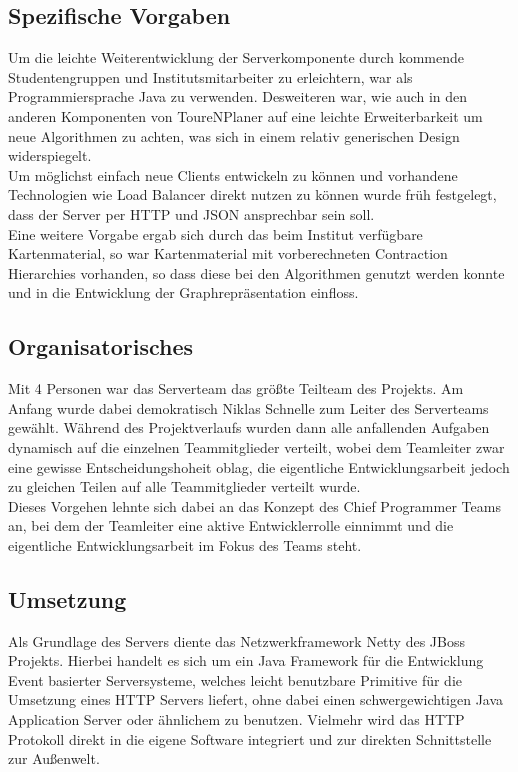 \subsection*{Spezifische Vorgaben}
Um die leichte Weiterentwicklung der Serverkomponente durch kommende Studentengruppen und Institutsmitarbeiter zu erleichtern, war als Programmiersprache Java zu verwenden. Desweiteren war, wie auch in den anderen Komponenten von ToureNPlaner auf eine leichte Erweiterbarkeit um neue Algorithmen zu achten, was sich in einem relativ generischen Design widerspiegelt.\\
Um möglichst einfach neue Clients entwickeln zu können und vorhandene Technologien wie Load Balancer direkt nutzen zu können wurde früh festgelegt, dass der Server per HTTP und JSON ansprechbar sein soll.\\
Eine weitere Vorgabe ergab sich durch das beim Institut verfügbare Kartenmaterial, so war Kartenmaterial mit vorberechneten Contraction Hierarchies vorhanden, so dass diese bei den Algorithmen genutzt werden konnte und in die Entwicklung der Graphrepräsentation einfloss.
\subsection*{Organisatorisches}
Mit 4 Personen war das Serverteam das größte Teilteam des Projekts. Am Anfang wurde dabei demokratisch Niklas Schnelle zum Leiter des Serverteams gewählt. Während des Projektverlaufs wurden dann alle anfallenden Aufgaben dynamisch auf die einzelnen Teammitglieder verteilt, wobei dem Teamleiter zwar eine gewisse Entscheidungshoheit oblag, die eigentliche Entwicklungsarbeit jedoch zu gleichen Teilen auf alle Teammitglieder verteilt wurde.\\
Dieses Vorgehen lehnte sich dabei an das Konzept des Chief Programmer Teams an, bei dem der Teamleiter eine aktive Entwicklerrolle einnimmt und die eigentliche Entwicklungsarbeit im Fokus des Teams steht.
\subsection*{Umsetzung}
Als Grundlage des Servers diente das Netzwerkframework Netty des JBoss Projekts. Hierbei handelt es sich um ein Java Framework für die Entwicklung Event basierter Serversysteme, welches leicht benutzbare Primitive für die Umsetzung eines HTTP Servers liefert, ohne dabei einen schwergewichtigen Java Application Server oder ähnlichem zu benutzen. Vielmehr wird das HTTP Protokoll direkt in die eigene Software integriert und zur direkten Schnittstelle zur Außenwelt.\\
